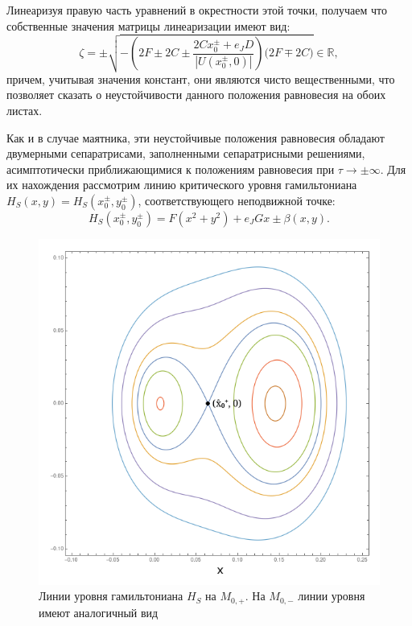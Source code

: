 Линеаризуя правую часть уравнений в окрестности этой точки, получаем что собственные значения матрицы линеаризации имеют вид:
$$\zeta = \pm \sqrt{- \left( 2F \pm 2C \pm \frac{2Cx_0^{\pm}+e_JD}{|U(x_0^{\pm},0)|} \right)\big( 2F \mp 2C \big)} \in \mathbb{R},$$
причем, учитывая значения констант, они являются чисто вещественными, что позволяет сказать о неустойчивости данного положения равновесия на обоих листах.

Как и в случае маятника, эти неустойчивые положения равновесия обладают двумерными сепаратрисами, заполненными сепаратрисными решениями, асимптотически приближающимися к положениям равновесия при $\tau\to \pm\infty$. Для их нахождения рассмотрим линию критического уровня гамильтониана $H_S(x,y) = H_S(x_0^{\pm},y_0^{\pm})$, соответствующего неподвижной точке:
$$H_S(x_0^{\pm},y_0^{\pm}) = F(x^2+y^2)+e_JGx \pm \beta(x,y).$$

\begin{figure}[H]
\centering
\includegraphics[scale=0.4]{../img/Hlines.png}
\caption{Линии уровня гамильтониана $H_S$ на $M_{0,+}$. На $M_{0,-}$ линии уровня имеют аналогичный вид}
\label{levels_slow}
\end{figure}

